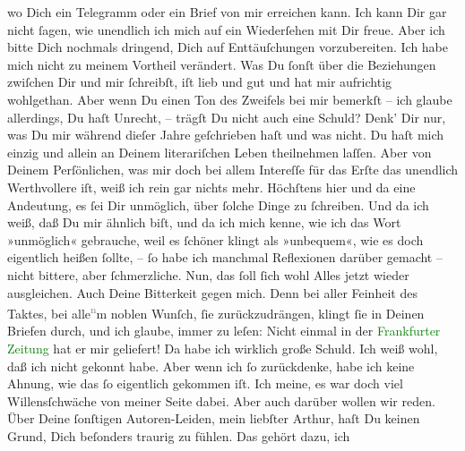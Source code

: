                wo Dich ein Telegramm oder ein Brief von mir erreichen kann. Ich kann Dir gar nicht
               ſagen, wie unendlich ich mich auf ein Wiederſehen mit Dir freue. Aber ich bitte Dich
               nochmals dringend, Dich auf Enttäuſchungen vorzubereiten. Ich habe mich nicht zu
               meinem Vortheil verändert.\pend
           \pstart
           Was Du ſonſt über die Beziehungen zwiſchen Dir und mir ſchreibſt, iſt lieb und gut
               und hat mir aufrichtig wohlgethan. Aber wenn Du einen Ton des Zweifels bei {\pb}mir bemerkſt – ich glaube allerdings, Du haſt
               Unrecht, – trägſt Du nicht auch eine Schuld? Denk’ Dir nur, was Du mir während dieſer
               Jahre geſchrieben haſt und was nicht. Du haſt mich einzig und allein an Deinem
               literariſchen Leben theilnehmen laſſen. Aber von Deinem Perſönlichen, was mir doch
               bei allem Intereſſe für das Erſte das unendlich Werthvollere iſt, weiß ich rein gar
               nichts mehr. Höchſtens hier und da eine Andeutung, es ſei Dir unmöglich, über ſolche
               Dinge zu ſchreiben. Und da ich weiß, daß Du mir ähnlich biſt, und da ich mich kenne,
               wie ich das Wort »unmöglich« gebrauche, weil es ſchöner klingt als »unbequem«, {\pb}wie es doch eigentlich heißen ſollte, – ſo habe ich
               manchmal Reflexionen darüber gemacht – nicht bittere, aber ſchmerzliche. Nun, das
               ſoll ſich wohl Alles jetzt wieder ausgleichen. Auch Deine Bitterkeit gegen mich. Denn
               bei aller Feinheit des Taktes, bei alle\substVorne{}\textsuperscript{\textcolor{gray}{n}}\substDazwischen{}m\substHinten{} noblen Wunſch, ſie zurückzudrängen, klingt ſie in Deinen Briefen durch, und
               ich glaube, immer zu leſen: Nicht einmal \label{K_L02712-33v}\label{K_L02712-33h} in der \textcolor{green}{Frankfurter Zeitung}{}\ledrightnote{\textcolor{green}{Frankfurter Zeitung}} hat er mir
               geliefert! Da habe ich wirklich große Schuld. Ich weiß wohl, daß ich nicht gekonnt
               habe. Aber wenn ich ſo zurückdenke, habe ich keine Ahnung, wie das ſo eigentlich {\pb}gekommen iſt. Ich meine, es war doch viel
               Willensſchwäche von meiner Seite dabei. Aber auch darüber wollen wir reden. Über
               Deine ſonſtigen Autoren-Leiden, mein liebſter Arthur,  haſt Du keinen Grund, Dich beſonders traurig zu fühlen. Das gehört dazu, ich
